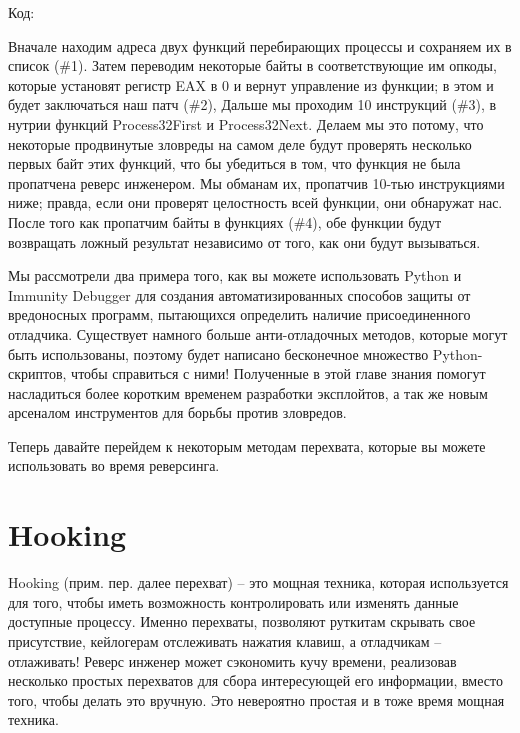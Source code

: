 \documentclass[12pt]{book}
\begin{document}
Код:



Вначале находим адреса двух функций перебирающих процессы и сохраняем их в список (\#1). Затем переводим некоторые байты в соответствующие им опкоды, которые установят регистр EAX в 0 и вернут управление из функции; в этом и будет заключаться наш патч (\#2), Дальше мы проходим 10 инструкций (\#3), в нутрии функций Process32First и Process32Next. Делаем мы это потому, что некоторые продвинутые зловреды на самом деле будут проверять несколько первых байт этих функций, что бы убедиться в том, что функция не была пропатчена реверс инженером. Мы обманам их, пропатчив 10-тью инструкциями ниже; правда, если они проверят целостность всей функции, они обнаружат нас. После того как пропатчим байты в функциях (\#4), обе функции будут возвращать ложный результат независимо от того, как они будут вызываться.

Мы рассмотрели два примера того, как вы можете использовать Python и Immunity Debugger для создания автоматизированных способов защиты от вредоносных программ, пытающихся определить наличие присоединенного отладчика. Существует намного больше анти-отладочных методов, которые могут быть использованы, поэтому будет написано бесконечное множество Python-скриптов, чтобы справиться с ними! Полученные в этой главе знания помогут насладиться более коротким временем разработки эксплойтов, а так же новым арсеналом инструментов для борьбы против зловредов. 

Теперь давайте перейдем к некоторым методам перехвата, которые вы можете использовать во время реверсинга.

\chapter{Hooking}

Hooking (прим. пер. далее перехват) – это мощная техника, которая используется для того, чтобы иметь возможность контролировать или изменять данные доступные процессу. Именно перехваты, позволяют руткитам скрывать свое присутствие, кейлогерам отслеживать нажатия клавиш, а отладчикам – отлаживать! Реверс инженер может сэкономить кучу времени, реализовав несколько простых перехватов для сбора интересующей его информации, вместо того, чтобы делать это вручную. Это невероятно простая и в тоже время мощная техника.
\end{document}
